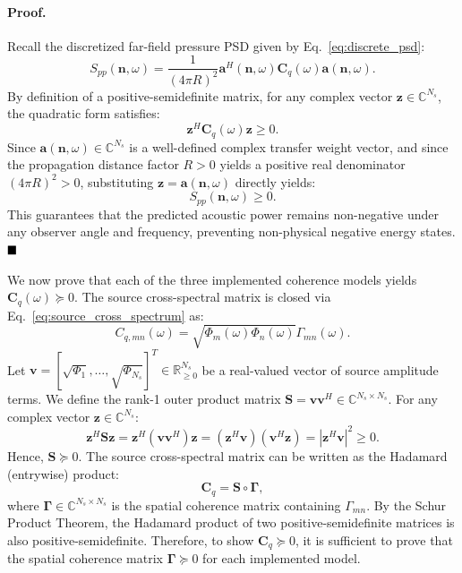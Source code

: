 \documentclass[11pt]{article}
\newcommand{\vect}[1]{\bm{#1}}
\newcommand{\mat}[1]{\bm{#1}}
\begin{document}
\paragraph{Proof.}
Recall the discretized far-field pressure PSD given by Eq.~\ref{eq:discrete_psd}:
\begin{equation*}
    S_{pp}(\vect{n},\omega)
    =
    \frac{1}{(4\pi R)^2}
    \vect{a}^{H}(\vect{n},\omega)
    \mat{C}_q(\omega)
    \vect{a}(\vect{n},\omega).
\end{equation*}
By definition of a positive-semidefinite matrix, for any complex vector $\vect{z} \in \mathbb{C}^{N_s}$, the quadratic form satisfies:
\begin{equation*}
    \vect{z}^H \mat{C}_q(\omega) \vect{z} \ge 0.
\end{equation*}
Since $\vect{a}(\vect{n},\omega) \in \mathbb{C}^{N_s}$ is a well-defined complex transfer weight vector, and since the propagation distance factor $R > 0$ yields a positive real denominator $(4\pi R)^2 > 0$, substituting $\vect{z} = \vect{a}(\vect{n},\omega)$ directly yields:
\begin{equation*}
    S_{pp}(\vect{n},\omega) \ge 0.
\end{equation*}
This guarantees that the predicted acoustic power remains non-negative under any observer angle and frequency, preventing non-physical negative energy states. $\hfill \blacksquare$

\vspace{1em}
We now prove that each of the three implemented coherence models yields $\mat{C}_q(\omega) \succeq 0$. The source cross-spectral matrix is closed via Eq.~\ref{eq:source_cross_spectrum} as:
\begin{equation*}
    C_{q,mn}(\omega) = \sqrt{\Phi_m(\omega)\Phi_n(\omega)} \Gamma_{mn}(\omega).
\end{equation*}
Let $\vect{v} = [\sqrt{\Phi_1}, \dots, \sqrt{\Phi_{N_s}}]^T \in \mathbb{R}_{\ge0}^{N_s}$ be a real-valued vector of source amplitude terms. We define the rank-1 outer product matrix $\mat{S} = \vect{v}\vect{v}^H \in \mathbb{C}^{N_s \times N_s}$. For any complex vector $\vect{z} \in \mathbb{C}^{N_s}$:
\begin{equation*}
    \vect{z}^H \mat{S} \vect{z}
    =
    \vect{z}^H (\vect{v}\vect{v}^H) \vect{z}
    =
    (\vect{z}^H \vect{v})(\vect{v}^H \vect{z})
    =
    \left| \vect{z}^H \vect{v} \right|^2 \ge 0.
\end{equation*}
Hence, $\mat{S} \succeq 0$. The source cross-spectral matrix can be written as the Hadamard (entrywise) product:
\begin{equation*}
    \mat{C}_q = \mat{S} \circ \mat{\Gamma},
\end{equation*}
where $\mat{\Gamma} \in \mathbb{C}^{N_s \times N_s}$ is the spatial coherence matrix containing $\Gamma_{mn}$. By the Schur Product Theorem, the Hadamard product of two positive-semidefinite matrices is also positive-semidefinite. Therefore, to show $\mat{C}_q \succeq 0$, it is sufficient to prove that the spatial coherence matrix $\mat{\Gamma} \succeq 0$ for each implemented model.
\end{document}
